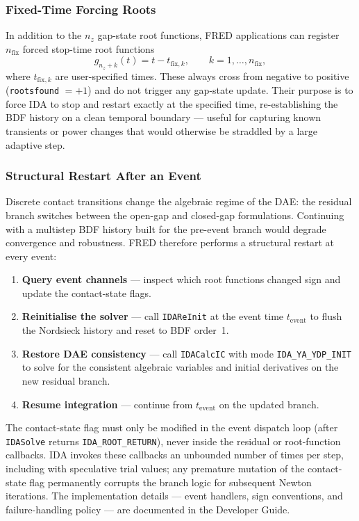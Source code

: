 \begin{refsection}
\subsubsection{Fixed-Time Forcing Roots}

In addition to the $n_z$ gap-state root functions, FRED applications can register $n_\mathrm{fix}$ forced stop-time root functions
\begin{equation}
  g_{n_z + k}(t) = t - t_{\mathrm{fix},k}, \qquad k = 1,\ldots,n_\mathrm{fix},
  \label{eq:fixed_time_roots}
\end{equation}
where $t_{\mathrm{fix},k}$ are user-specified times. These always cross from negative to positive (\texttt{rootsfound} $= +1$) and do not trigger any gap-state update. Their purpose is to force IDA to stop and restart exactly at the specified time, re-establishing the BDF history on a clean temporal boundary --- useful for capturing known transients or power changes that would otherwise be straddled by a large adaptive step.

\subsubsection{Structural Restart After an Event}

Discrete contact transitions change the algebraic regime of the DAE: the residual branch switches between the open-gap and closed-gap formulations. Continuing with a multistep BDF history built for the pre-event branch would degrade convergence and robustness. FRED therefore performs a structural restart at every event:

\begin{enumerate}
\item \textbf{Query event channels} --- inspect which root functions changed sign and update the contact-state flags.
\item \textbf{Reinitialise the solver} --- call \texttt{IDAReInit} at the event time $t_\mathrm{event}$ to flush the Nordsieck history and reset to BDF order~1.
\item \textbf{Restore DAE consistency} --- call \texttt{IDACalcIC} with mode \texttt{IDA\_YA\_YDP\_INIT} to solve for the consistent algebraic variables and initial derivatives on the new residual branch.
\item \textbf{Resume integration} --- continue from $t_\mathrm{event}$ on the updated branch.
\end{enumerate}

The contact-state flag must only be modified in the event dispatch loop (after \texttt{IDASolve} returns \texttt{IDA\_ROOT\_RETURN}), never inside the residual or root-function callbacks. IDA invokes these callbacks an unbounded number of times per step, including with speculative trial values; any premature mutation of the contact-state flag permanently corrupts the branch logic for subsequent Newton iterations. The implementation details --- event handlers, sign conventions, and failure-handling policy --- are documented in the Developer Guide.


\end{refsection}

